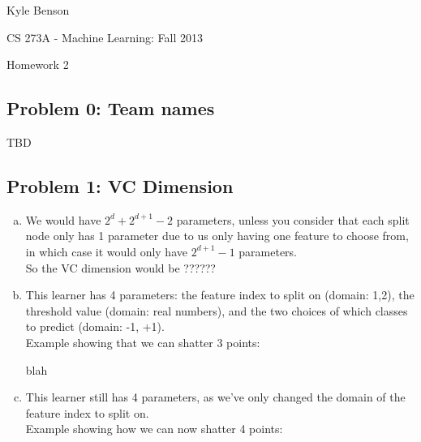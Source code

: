 \documentclass[twoside,11pt]{article}
\newcommand{\figdir}{figs}
\theoremstyle{definition}
\begin{document}
\centerline{\Large Kyle Benson}
\centerline{CS 273A - Machine Learning: Fall 2013}
\centerline{Homework 2}

\subsection*{Problem 0: Team names}

TBD

\subsection*{Problem 1: VC Dimension}

\begin{enumerate}[(a)]

\item We would have $2^d + 2^{d+1} - 2$ parameters, unless you consider that each split node only has 1 parameter due to us only having one feature to choose from, in which case it would only have $2^{d+1} - 1$ parameters. \\

So the VC dimension would be ??????

\item This learner has 4 parameters: the feature index to split on (domain: 1,2), the threshold value (domain: real numbers), and the two choices of which classes to predict (domain: -1, +1). \\
Example showing that we can shatter 3 points:
\vspace{2in}

blah

\item This learner still has 4 parameters, as we've only changed the domain of the feature index to split on. \\
Example showing how we can now shatter 4 points:
\vspace{2in}


\end{enumerate}
\end{document}
